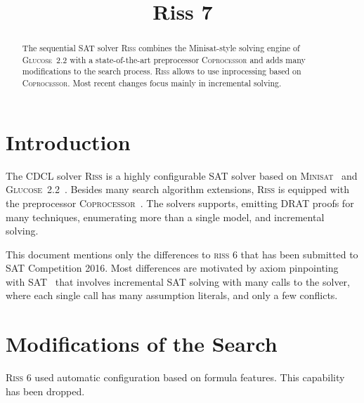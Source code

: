 \documentclass[conference]{IEEEtran}
\begin{document}
	
\title{Riss 7}

\author{
}

\maketitle

\def\coprocessor{\textsc{Coprocessor}\xspace}
\def\glucose{\textsc{Glucose~2.2}\xspace}
\def\minisat{\textsc{Minisat~2.2}\xspace}
\def\riss{\textsc{Riss}\xspace}
\def\SATPin{\textsc{SATPin}\xspace}

\begin{abstract}
The sequential SAT solver \riss combines the Minisat-style solving engine of \glucose with a state-of-the-art preprocessor \textsc{Coprocessor} and adds many modifications to the search process. 
\riss allows to use inprocessing based on \coprocessor.
Most recent changes focus mainly in incremental solving.
\end{abstract}

\section{Introduction}

The CDCL solver \riss is a highly configurable SAT solver based on \textsc{Minisat}~\cite{EenS:2003} and \glucose ~\cite{AudemardS:2009,Audemard:2012:RRS:2405292.2405308}. 
Besides many search algorithm extensions, \riss is equipped with the preprocessor \textsc{Coprocessor}~\cite{Manthey:2012}. 
The solvers supports, emitting DRAT proofs for many techniques, enumerating more than a single model, and incremental solving.

This document mentions only the differences to \textsc{riss 6} that has been submitted to SAT Competition 2016. 
% 
Most differences are motivated by axiom pinpointing with SAT~\cite{MaPR16} that involves incremental SAT solving with many calls to the solver, where each single call has many assumption literals, and only a few conflicts.

\section{Modifications of the Search}

\textsc{Riss 6} used automatic configuration based on formula features. This capability has been dropped. 
\end{document}
